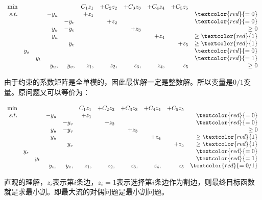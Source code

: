  \begin{footnotesize}
\[
\begin{array}{rrrrrrrrrrrrrrrrr}
 \min &       &   &   &   &  C_{1} z_1 & +C_{2} z_2   & +C_{3} z_3 & +C_{4} z_4& +C_{5}z_5 & \\
  s.t. &     &    &-y_u &            &+z_1  &  &  &  & & \textcolor{red}{ = 0}\\
        &      &   &         & -y_v    &           &+z_2  &  &  & &  \textcolor{red}{ = 0}\\
        &        &   &  y_u & -y_v    &           &           &+z_3 &  & &  \geq 0\\
        &        &    &   y_u &        &           &           &      & +z_4 & &  \geq \textcolor{red}{1}\\
        &        &   &              &   y_v      &           &           &      &     &  +z_5 &  \geq \textcolor{red}{1}\\
       & y_s &    &              &         &           &           &      &     &    & \textcolor{red}{ = 0}\\
       &       &   y_t  &              &         &           &           &      &     &    & \textcolor{red}{ = 1}\\
      &       & & y_u,  & y_v,  &  z_1,  &  z_2,   &  z_3, &  z_4,& z_5 & \geq 0
\end{array} \nonumber
\]
\end{footnotesize}

由于约束的系数矩阵是全单模的，因此最优解一定是整数解。所以变量是$0/1$变量。原问题又可以等价为：

\begin{footnotesize}
\[
\begin{array}{rrrrrrrrrrrrrrrrr}
 \min &       &   &   &   &  C_{1} z_1 & +C_{2} z_2   & +C_{3} z_3 & +C_{4} z_4& +C_{5}z_5 & \\
  s.t. &     &    &-y_u &            &+z_1  &  &  &  & & \textcolor{red}{ = 0}\\
        &      &   &         & -y_v    &           &+z_2  &  &  & &  \textcolor{red}{ = 0}\\
        &        &   &  y_u & -y_v    &           &           &+z_3 &  & &  \geq 0\\
        &        &    &   y_u &        &           &           &      & +z_4 & &  \geq \textcolor{red}{1}\\
        &        &   &              &   y_v      &           &           &      &     &  +z_5 &  \geq \textcolor{red}{1}\\
       & y_s &    &              &         &           &           &      &     &    & \textcolor{red}{ = 0}\\
       &       &   y_t  &              &         &           &           &      &     &    & \textcolor{red}{ = 1}\\
      &       & & y_u,  & y_v,  &  z_1,  &  z_2,   &  z_3, &  z_4,& z_5 & \textcolor{red}{ = 0/1}
\end{array} \nonumber
\]
\end{footnotesize}
直观的理解，$z_i$表示第$i$条边，$z_i=1$表示选择第$i$条边作为割边，则最终目标函数就是求最小割。即最大流的对偶问题是最小割问题。

